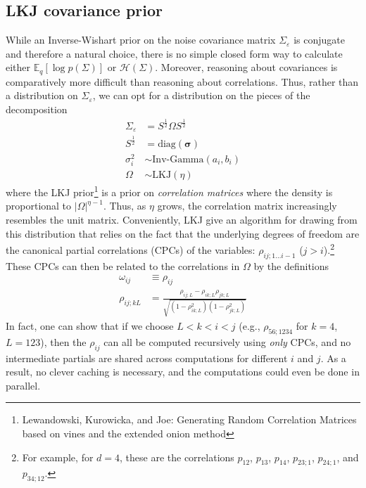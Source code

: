\documentclass[11pt]{article}
\begin{document}
\subsection{LKJ covariance prior}
While an Inverse-Wishart prior on the noise covariance matrix $\Sigma_\varepsilon$ is conjugate and therefore a natural choice, there is no simple closed form way to calculate either $\mathbb{E}_q[\log p(\Sigma)]$ or $\mathcal{H}(\Sigma)$. Moreover, reasoning about covariances is comparatively more difficult than reasoning about correlations. Thus, rather than a distribution on $\Sigma_\varepsilon$, we can opt for a distribution on the pieces of the decomposition
\begin{align}
    \label{sigeps_def}
    \Sigma_\varepsilon &= S^{\frac{1}{2}} \Omega S^{\frac{1}{2}} \\
    S^{\frac{1}{2}} &= \mathrm{diag}(\boldsymbol{\sigma}) \\
    \sigma^2_i &\sim \text{Inv-Gamma}(a_i, b_i) \\
    \Omega &\sim \mathrm{LKJ}(\eta)
\end{align}
where the LKJ prior\footnote{Lewandowski, Kurowicka, and Joe: Generating Random Correlation Matrices based on vines and the extended onion method} is a prior on \emph{correlation matrices} where the density is proportional to $ |\Omega|^{\eta - 1}$. Thus, as $\eta$ grows, the correlation matrix increasingly resembles the unit matrix. Conveniently, LKJ give an algorithm for drawing from this distribution that relies on the fact that the underlying degrees of freedom are the canonical partial correlations (CPCs) of the variables: $\rho_{ij;1\ldots i - 1}$ ($j > i$).\footnote{For example, for $d=4$, these are the correlations $p_{12}$, $p_{13}$, $p_{14}$, $p_{23;1}$, $p_{24;1}$, and $p_{34;12}$.} These CPCs can then be related to the correlations in $\Omega$ by the definitions
\begin{align}
    \omega_{ij} &\equiv \rho_{ij} \\
    \label{rho_recursion}
    \rho_{ij;kL} &= \frac{\rho_{ij;L} - \rho_{ik;L}\rho_{jk;L}}
    {\sqrt{(1 - \rho_{ik;L}^2)(1 - \rho_{jk;L}^2)}}
\end{align}
In fact, one can show that if we choose $L < k < i < j$ (e.g., $\rho_{56;1234}$ for $k=4$, $L = 123$), then the $\rho_{ij}$ can all be computed recursively using \emph{only} CPCs, and no intermediate partials are shared across computations for different $i$ and $j$. As a result, no clever caching is necessary, and the computations could even be done in parallel.
\end{document}
